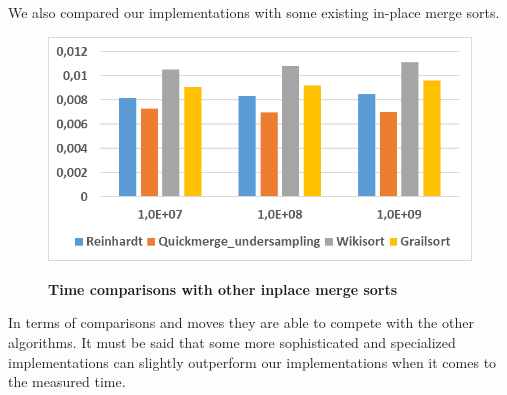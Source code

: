 \documentclass[11pt,pdftex,a4paper, twocolumn]{article}
\begin{document}
We also compared our implementations with some existing in-place merge sorts. \\
\begin{figure}[H]
\includegraphics[width=\linewidth]{Diagramm-Bilder/time-other-inplace.JPG} \\
\caption{\textbf{Time comparisons with other inplace merge sorts}} \label{fig:time-other-inplace}
\end{figure}
In terms of comparisons and moves they are able to compete with the other algorithms. It must be said that some more sophisticated and specialized implementations can slightly outperform our implementations when it comes to the measured time.



\end{document}
